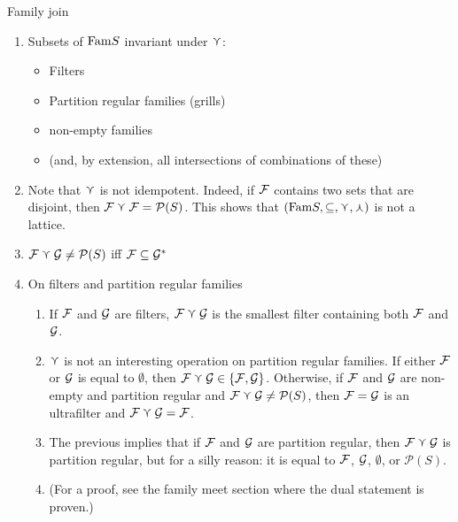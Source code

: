 Family join
\begin{enumerate}
    \item Subsets of $\text{Fam}{S}$ invariant under $\curlyvee$:
    \begin{itemize}
        \item Filters
        \item Partition regular families (grills)
        \item non-empty families
        \item (and, by extension, all intersections of combinations of these)
    \end{itemize}
    
    \item Note that $\curlyvee$ is not idempotent.  Indeed, if $\mathcal{F}$ contains two sets that are disjoint, then $\mathcal{F} \curlyvee \mathcal{F} = \mathcal{P}(S)$.  This shows that $(\text{Fam}{S},\subseteq,\curlyvee,\curlywedge)$ is not a lattice.
    
    \item $\mathcal{F} \curlyvee \mathcal{G} \neq \mathcal{P}(S)$ iff $\mathcal{F} \subseteq \mathcal{G}^*$  
        
    \item On filters and partition regular families
    \begin{enumerate}
        \item If $\mathcal{F}$ and $\mathcal{G}$ are filters, $\mathcal{F} \curlyvee \mathcal{G}$ is the smallest filter containing both $\mathcal{F}$ and $\mathcal{G}$.

        \item $\curlyvee$ is not an interesting operation on partition regular families.  If either $\mathcal{F}$ or $\mathcal{G}$ is equal to $\emptyset$, then $\mathcal{F} \curlyvee \mathcal{G} \in \{\mathcal{F}, \mathcal{G}\}$.  Otherwise, if $\mathcal{F}$ and $\mathcal{G}$ are non-empty and partition regular and $\mathcal{F} \curlyvee \mathcal{G} \neq \mathcal{P}(S)$, then $\mathcal{F} = \mathcal{G}$ is an ultrafilter and $\mathcal{F} \curlyvee \mathcal{G} = \mathcal{F}$.

        \item The previous implies that if $\mathcal{F}$ and $\mathcal{G}$ are partition regular, then $\mathcal{F} \curlyvee \mathcal{G}$ is partition regular, but for a silly reason: it is equal to $\mathcal{F}$, $\mathcal{G}$, $\emptyset$, or $\mathcal{P}(S)$.

        \item (For a proof, see the family meet section where the dual statement is proven.)
    \end{enumerate}
\end{enumerate}

